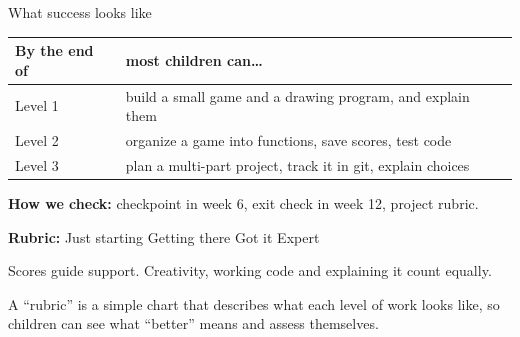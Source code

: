\documentclass[20pt,t]{beamer}
\begin{document}
\begin{frame}{What success looks like}
  \vskip0.05in
  \renewcommand{\arraystretch}{1.25}
  \begin{tabularx}{\textwidth}{@{}>{\semibold}p{2.2in}>{\RaggedRight\arraybackslash}X@{}}
    \toprule
    By the end of & most children can\dots\\
    \midrule
    \textcolor{kcbluetext}{Level 1} & build a small game and a drawing program, and explain them\\
    \textcolor{kcgreentext}{Level 2} & organize a game into functions, save scores, test code\\
    \textcolor{kcvermilliontext}{Level 3} & plan a multi-part project, track it in git, explain choices\\
    \bottomrule
  \end{tabularx}
  \vskip0.15in
  \textbf{How we check:} checkpoint in week 6, exit check in week 12, project rubric.\par
  \vskip0.05in
  \textbf{Rubric:} Just starting \textperiodcentered{} Getting there \textperiodcentered{} Got it \textperiodcentered{} Expert
  \begin{keybox}[No grades]
    Scores guide support. Creativity, working code and explaining it count equally.
  \end{keybox}
  {A \enquote{rubric} is a simple chart that describes what each level of work looks like, so
    children can see what \enquote{better} means and assess themselves.}
  {}
\end{frame}
\end{document}
